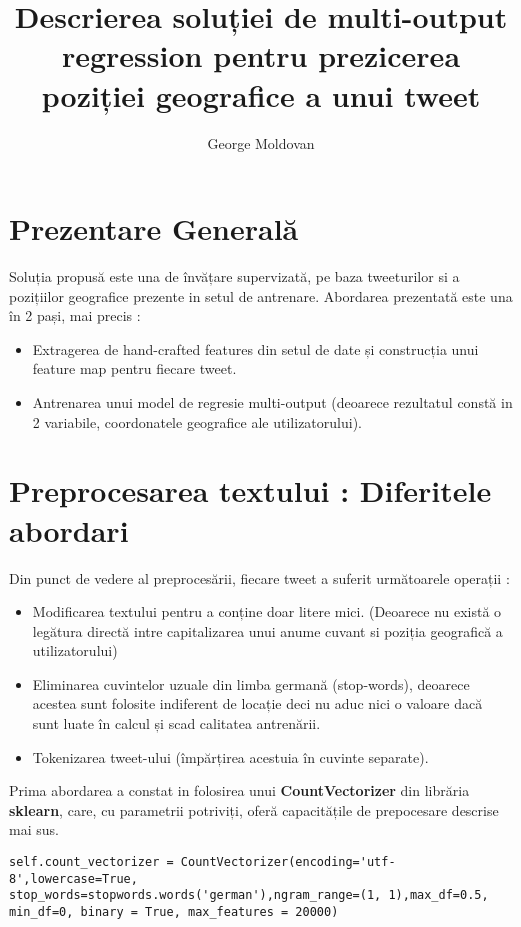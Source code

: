 \documentclass[a4paper,12pt]{article}
\title{Descrierea soluției de multi-output regression pentru prezicerea poziției geografice a unui tweet}
\author{George Moldovan}
\begin{document}
\maketitle
\section{Prezentare Generală}
\par Soluția propusă este una de învățare supervizată, pe baza tweeturilor si a pozițiilor geografice prezente in setul de antrenare. Abordarea prezentată este una în 2 pași, mai precis :
\begin{itemize}
\item Extragerea de hand-crafted features din setul de date și construcția unui feature map pentru fiecare tweet.
\item Antrenarea unui model de regresie multi-output (deoarece rezultatul constă in 2 variabile, coordonatele geografice ale utilizatorului).
\end{itemize}

\section{Preprocesarea textului : Diferitele abordari}
Din punct de vedere al preprocesării, fiecare tweet a suferit următoarele operații :
\begin{itemize} 
\item Modificarea textului pentru a conține doar litere mici. (Deoarece nu există o legătura directă intre capitalizarea unui anume cuvant si poziția geografică a utilizatorului)
\item Eliminarea cuvintelor uzuale din limba germană (stop-words), deoarece acestea sunt folosite indiferent de locație deci nu aduc nici o valoare dacă sunt luate în calcul și scad calitatea antrenării.
\item Tokenizarea tweet-ului (împărțirea acestuia în cuvinte separate).
\end{itemize}
Prima abordarea a constat in folosirea unui \textbf{CountVectorizer} din librăria \textbf{sklearn}, care, cu parametrii potriviți, oferă capacitățile de prepocesare descrise mai sus.  
\begin{verbatim}
self.count_vectorizer = CountVectorizer(encoding='utf-8',lowercase=True, 
stop_words=stopwords.words('german'),ngram_range=(1, 1),max_df=0.5, 
min_df=0, binary = True, max_features = 20000)
\end{verbatim}
\end{document}
